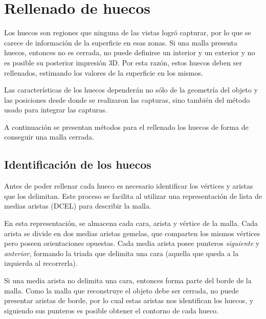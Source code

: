 \section{Rellenado de huecos}
Los huecos son regiones que ninguna de las vistas logró capturar,
por lo que se carece de información de la superficie en esas zonas.
Si una malla presenta huecos, entonces no es cerrada,
no puede definirse un interior y un exterior
y no es posible su posterior impresión 3D.
Por esta razón, estos huecos deben ser rellenados,
estimando los valores de la superficie en los mismos.


Las características de los huecos dependerán no sólo de la geometría del objeto y las
posiciones desde donde se realizaron las capturas, sino también del método usado
para integrar las capturas.


A continuación se presentan métodos para el rellenado los huecos de forma de conseguir una malla cerrada.

\subsection{Identificación de los huecos}
Antes de poder rellenar cada hueco es necesario identificar los vértices y aristas que los delimitan.
Este proceso se facilita al utilizar una representación
de lista de medias aristas (DCEL) para describir la malla.

En esta representación, se almacena cada cara, arista y vértice de la malla.
Cada arista se divide en dos medias aristas gemelas, que comparten los mismos vértices
pero poseen orientaciones opuestas.
Cada media arista posee punteros \emph{siguiente} y \emph{anterior},
formando la triada que delimita una cara (aquella que queda a la izquierda al recorrerla).

Si una media arista no delimita una cara, entonces forma parte del borde de la malla.
Como la malla que reconstruye el objeto debe ser cerrada, no puede presentar aristas de borde,
por lo cual estas aristas nos identifican los huecos,
y siguiendo sus punteros es posible obtener el contorno de cada hueco.

